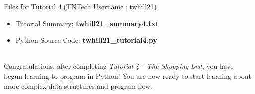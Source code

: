\documentclass[12pt]{article}
\begin{document}
\begin{description}[labelindent=1cm]
\underline{Files for Tutorial 4 (TNTech Username : twhill21)}

\begin{itemize}

\item Tutorial Summary: \textbf{ twhill21\_summary4.txt}

\item Python Source Code: \textbf{ twhill21\_tutorial4.py}

\end{itemize}


\item[\textbf{\underline{Tutorial Complete:}}] \hfill \vspace{3mm}\\ 
	Congratulations, after completing {\it Tutorial 4 - The Shopping List}, you have begun learning to program in Python! You are now ready to start learning about more complex data structures and program flow. \\

\end{description}
\end{document}
